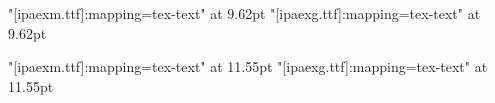 {      %
      \font\reducedmczzz"[ipaexm.ttf]:mapping=tex-text" at 9.62pt
      \font\reducedgtzzz"[ipaexg.ttf]:mapping=tex-text" at 9.62pt
      \def\reducedmc{\setjafont\reducedmczzz}
      \def\reducedgt{\setjafont\reducedgtzzz}

      \font\shortcontmczzz"[ipaexm.ttf]:mapping=tex-text" at 11.55pt
      \font\shortcontgtzzz"[ipaexg.ttf]:mapping=tex-text" at 11.55pt
      \def\shortcontmc{\setjafont\shortcontmczzz}
      \def\shortcontgt{\setjafont\shortcontgtzzz}

    }

    \let\definealphabetictextfontsizex\definetextfontsizex
